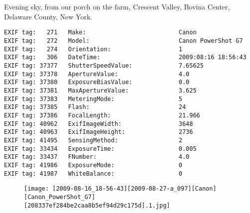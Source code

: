 \section{\protect{}}
\noindent Evening sky, from our porch on the farm, Crescent Valley, Bovina Center, Delaware County, New York.
\noindent
\begin{lstlisting}
EXIF tag:   271   Make:                          Canon
EXIF tag:   272   Model:                         Canon PowerShot G7
EXIF tag:   274   Orientation:                   1
EXIF tag:   306   DateTime:                      2009:08:16 18:56:43
EXIF tag: 37377   ShutterSpeedValue:             7.65625
EXIF tag: 37378   ApertureValue:                 4.0
EXIF tag: 37380   ExposureBiasValue:             0.0
EXIF tag: 37381   MaxApertureValue:              3.625
EXIF tag: 37383   MeteringMode:                  5
EXIF tag: 37385   Flash:                         24
EXIF tag: 37386   FocalLength:                   21.966
EXIF tag: 40962   ExifImageWidth:                3648
EXIF tag: 40963   ExifImageHeight:               2736
EXIF tag: 41495   SensingMethod:                 2
EXIF tag: 33434   ExposureTime:                  0.005
EXIF tag: 33437   FNumber:                       4.0
EXIF tag: 41986   ExposureMode:                  0
EXIF tag: 41987   WhiteBalance:                  0

\end{lstlisting}
\clearpage
\begin{figure}
\raggedleft
\texttt{[image: [2009-08-16\_18-56-43][2009-08-27-a\_097][Canon][Canon\_PowerShot\_G7][208337ef284be2caa8b5ef94d29c175d].1.jpg]}
\end{figure}


\clearpage
